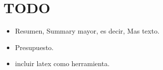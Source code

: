 %
%
%
%

\cleardoublepage
\chapter{TODO}
\label{chap:TODO}

\begin{itemize}
	\item Resumen, Summary mayor, es decir, Mas texto.
	\item Presupuesto.
	\item incluir latex como herramienta.
\end{itemize}
